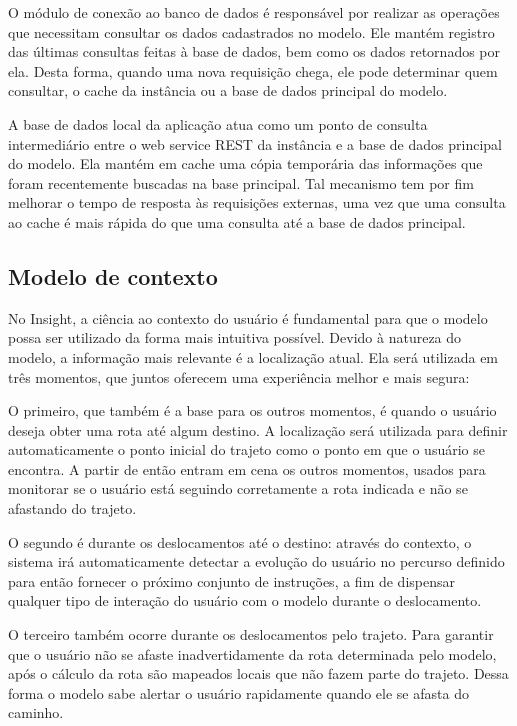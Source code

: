 \documentclass[twoside,english,brazilian]{UNISINOSartigo}
\begin{document}
O módulo de conexão ao banco de dados é responsável por realizar as operações que necessitam consultar os dados cadastrados no modelo. Ele mantém registro das últimas consultas feitas à base de dados, bem como os dados retornados por ela. Desta forma, quando uma nova requisição chega, ele pode determinar quem consultar, o cache da instância ou a base de dados principal do modelo.

A base de dados local da aplicação atua como um ponto de consulta intermediário entre o web service REST da instância e a base de dados principal do modelo. Ela mantém em cache uma cópia temporária das informações que foram recentemente buscadas na base principal. Tal mecanismo tem por fim melhorar o tempo de resposta às requisições externas, uma vez que uma consulta ao cache é mais rápida do que uma consulta até a base de dados principal.

\subsection{Modelo de contexto}
No Insight, a ciência ao contexto do usuário é fundamental para que o modelo possa ser utilizado da forma mais intuitiva possível. Devido à natureza do modelo, a informação mais relevante é a localização atual. Ela será utilizada em três momentos, que juntos oferecem uma experiência melhor e mais segura:

O primeiro, que também é a base para os outros momentos, é quando o usuário deseja obter uma rota até algum destino. A localização será utilizada para definir automaticamente o ponto inicial do trajeto como o ponto em que o usuário se encontra. A partir de então entram em cena os outros momentos, usados para monitorar se o usuário está seguindo corretamente a rota indicada e não se afastando do trajeto.

O segundo é durante os deslocamentos até o destino: através do contexto, o sistema irá automaticamente detectar a evolução do usuário no percurso definido para então fornecer o próximo conjunto de instruções, a fim de dispensar qualquer tipo de interação do usuário com o modelo durante o deslocamento. 

O terceiro também ocorre durante os deslocamentos pelo trajeto. Para garantir que o usuário não se afaste inadvertidamente da rota determinada pelo modelo, após o cálculo da rota são mapeados locais que não fazem parte do trajeto. Dessa forma o modelo sabe alertar o usuário rapidamente quando ele se afasta do caminho.
\end{document}
